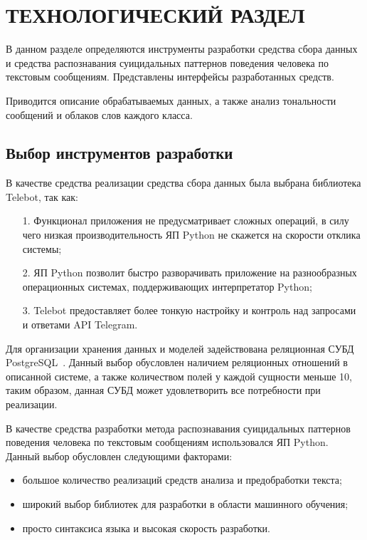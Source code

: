\section{ТЕХНОЛОГИЧЕСКИЙ РАЗДЕЛ}

В данном разделе определяются инструменты разработки средства сбора данных и средства распознавания суицидальных паттернов поведения человека по текстовым сообщениям.
Представлены интерфейсы разработанных средств.

Приводится описание обрабатываемых данных, а также анализ тональности сообщений и облаков слов каждого класса.

\subsection{Выбор инструментов разработки}

В качестве средства реализации средства сбора данных была выбрана библиотека Telebot, так как:

\begin{enumerate}
	\item[1.] Функционал приложения не предусматривает сложных операций, в силу чего низкая производительность ЯП Python не скажется на скорости отклика системы;
	\item[2.] ЯП Python позволит быстро разворачивать приложение на разнообразных операционных системах, поддерживающих интерпретатор Python;
	\item[3.] Telebot предоставляет более тонкую настройку и контроль над запросами и ответами API Telegram.
\end{enumerate}

Для организации хранения данных и моделей задействована реляционная СУБД PostgreSQL~\cite{postgres}. 
Данный выбор обусловлен наличием реляционных отношений в описанной системе, а также количеством полей у каждой сущности меньше 10, таким образом, данная СУБД может удовлетворить все потребности при реализации.

В качестве средства разработки метода распознавания суицидальных паттернов поведения человека по текстовым сообщениям использовался ЯП Python. Данный выбор обусловлен следующими факторами:

\begin{itemize}
	\item большое количество реализаций средств анализа и предобработки текста;
	\item широкий выбор библиотек для разработки в области машинного обучения;
	\item просто синтаксиса языка и высокая скорость разработки.
\end{itemize}

